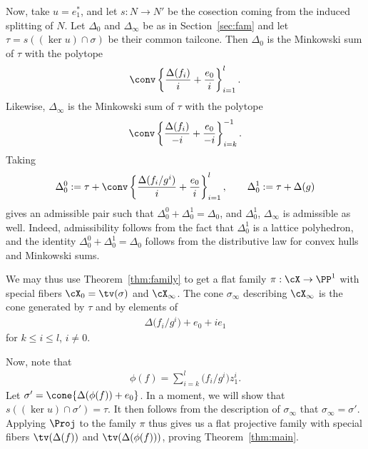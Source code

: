 Now, take $u=e_1^*$, and let $s:N\to N'$ be the cosection coming from the induced splitting of $N$.
Let $\Delta_0$ and $\Delta_\infty$ be as in Section~\ref{sec:fam}
and let $\tau= s( (\ker u)\cap \sigma)$ be their common tailcone.
Then $\Delta_0$ is the Minkowski sum of $\tau$ with the  polytope
\begin{gather*}
\conv \left \{\frac{\Delta(f_i)}{i}+\frac{e_0}{i}\right\}_{i=1}^l.
\end{gather*}
Likewise, $\Delta_\infty$ is the Minkowski sum of $\tau$ with the polytope
\begin{gather*}
\conv \left\{\frac{\Delta(f_i)}{-i}+\frac{e_0}{-i} \right\}_{i=k}^{-1}.
\end{gather*}
Taking
\begin{gather*}
\Delta_0^0 :=\tau+\conv \left \{\frac{\Delta(f_i/g^i)}{i}+\frac{e_0}{i}\right\}_{i=1}^l,\qquad
\Delta_0^1 :=\tau+\Delta(g)
\end{gather*}
gives an admissible pair such that $\Delta_0^0+\Delta_0^1=\Delta_0$, and $\Delta_0^1$, $\Delta_\infty$ is admissible as well. Indeed, admissibility follows from the fact that $\Delta_0^1$ is a lattice polyhedron, and the identity $\Delta_0^0+\Delta_0^1=\Delta_0$ follows from the distributive law for convex hulls and Minkowski sums.


We may thus use Theorem~\ref{thm:family} to get a f\/lat family $\pi:\cX\to\PP^1$ with special f\/ibers $\cX_0=\tv(\sigma)$ and $\cX_\infty$.
The cone $\sigma_\infty$ describing $\cX_\infty$ is the cone generated by $\tau$ and by elements of
\begin{gather*}
\Delta\big(f_i/g^i\big)+e_0+ie_1
\end{gather*}
for $k\leq i \leq l$, $i\neq 0$.

Now, note that
\begin{gather*}
\phi(f)=\sum_{i=k}^l \big(f_i/g^i\big)z_1^i.
\end{gather*}
Let $\sigma'=\cone\{\Delta(\phi(f))+e_0\}$. In a moment, we will show that $s( (\ker u)\cap \sigma')=\tau$. It then follows from the description of $\sigma_\infty$ that $\sigma_\infty=\sigma'$. Applying $\Proj$ to the family $\pi$ thus gives us a f\/lat projective family with special f\/ibers $\tv(\Delta(f))$ and $\tv(\Delta(\phi(f)))$, proving Theorem~\ref{thm:main}.

